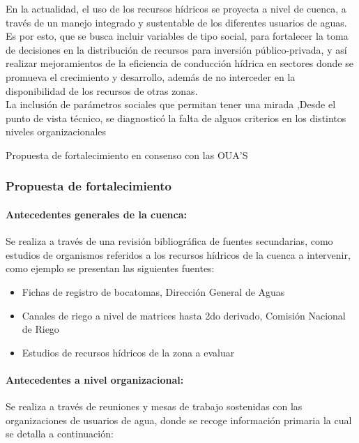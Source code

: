 \documentclass[]{article}
\begin{document}
En la actualidad, el uso de los recursos hídricos se proyecta a nivel de cuenca, a través de un manejo integrado y sustentable de los diferentes usuarios de aguas. Es por esto, que se busca incluir variables de tipo social, para fortalecer la toma de decisiones en la distribución de recursos para inversión público-privada, y así realizar mejoramientos de la eficiencia de conducción hídrica en sectores donde se promueva el crecimiento y desarrollo, además de no interceder en la disponibilidad de los recursos de otras zonas.\\

La inclusión de parámetros sociales que permitan tener una mirada ,Desde el punto de vista técnico, se diagnosticó la falta de alguos criterios en los distintos niveles organizacionales

Propuesta de fortalecimiento en consenso con las OUA'S

\subsubsection{Propuesta de fortalecimiento}




\paragraph{Antecedentes generales de la cuenca:}

Se realiza a través de una revisión bibliográfica de fuentes secundarias, como estudios de organismos referidos a los recursos hídricos de la cuenca a intervenir, como ejemplo se presentan las siguientes fuentes:\\

\begin{itemize}
\item Fichas de registro de bocatomas, Dirección General de Aguas
\item Canales de riego a nivel de matrices hasta 2do derivado, Comisión Nacional de Riego
\item Estudios de recursos hídricos de la zona a evaluar
\end{itemize}

\paragraph{Antecedentes a nivel organizacional:}

Se realiza a través de reuniones y mesas de trabajo sostenidas con las organizaciones de usuarios de agua, donde se recoge información primaria la cual se detalla a continuación:\\
\end{document}
